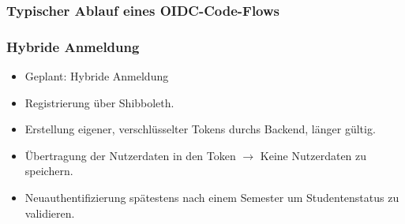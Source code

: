 \begin{frame}\frametitle{Typischer Ablauf eines OIDC-Code-Flows}
    \centering
\end{frame}

\begin{frame}\frametitle{Hybride Anmeldung}
    \begin{itemize}
        \item Geplant: Hybride Anmeldung
        \item Registrierung über Shibboleth.
        \item Erstellung eigener, verschlüsselter Tokens durchs Backend, länger gültig.
        \item Übertragung der Nutzerdaten in den Token $\rightarrow$ Keine Nutzerdaten zu speichern.
        \item Neuauthentifizierung spätestens nach einem Semester um Studentenstatus zu validieren.
    \end{itemize}
\end{frame}